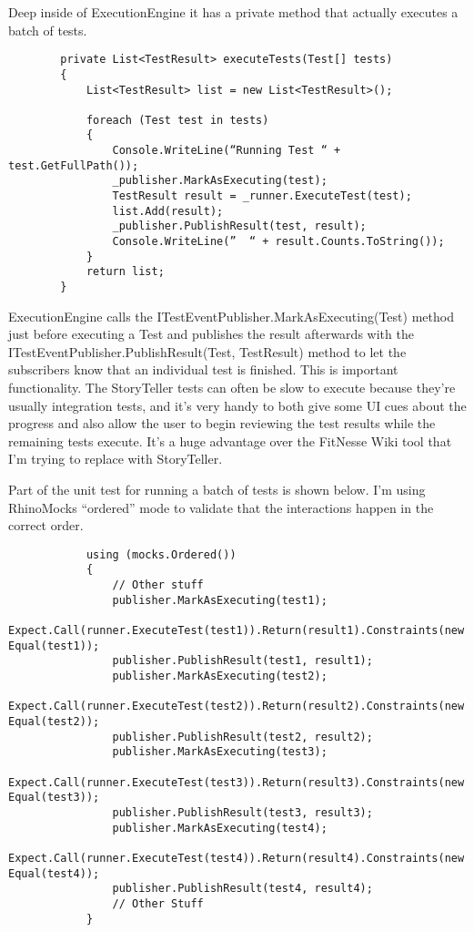 \documentclass{article}
\begin{document}
{Deep inside of ExecutionEngine it has a private method that actually executes a batch of tests. 
\begin{lstlisting}
        private List<TestResult> executeTests(Test[] tests)
        {
            List<TestResult> list = new List<TestResult>();

            foreach (Test test in tests)
            {
                Console.WriteLine(“Running Test “ + test.GetFullPath());
                _publisher.MarkAsExecuting(test);
                TestResult result = _runner.ExecuteTest(test);
                list.Add(result);
                _publisher.PublishResult(test, result);
                Console.WriteLine(”  “ + result.Counts.ToString());
            }
            return list;
        }
\end{lstlisting}

ExecutionEngine calls the ITestEventPublisher.MarkAsExecuting(Test) method just before executing a Test and publishes the result afterwards with the ITestEventPublisher.PublishResult(Test, TestResult) method to let the subscribers know that an individual test is finished.  This is important functionality.  The StoryTeller tests can often be slow to execute because they're usually integration tests, and it's very handy to both give some UI cues about the progress and also allow the user to begin reviewing the test results while the remaining tests execute.  It's a huge advantage over the FitNesse Wiki tool that I'm trying to replace with StoryTeller. 

Part of the unit test for running a batch of tests is shown below.  I'm using RhinoMocks “ordered” mode to validate that the interactions happen in the correct order.

\begin{lstlisting}
            using (mocks.Ordered())
            {
                // Other stuff
                publisher.MarkAsExecuting(test1);
                Expect.Call(runner.ExecuteTest(test1)).Return(result1).Constraints(new Equal(test1));
                publisher.PublishResult(test1, result1);
                publisher.MarkAsExecuting(test2);
                Expect.Call(runner.ExecuteTest(test2)).Return(result2).Constraints(new Equal(test2));
                publisher.PublishResult(test2, result2);
                publisher.MarkAsExecuting(test3);
                Expect.Call(runner.ExecuteTest(test3)).Return(result3).Constraints(new Equal(test3));
                publisher.PublishResult(test3, result3);
                publisher.MarkAsExecuting(test4);
                Expect.Call(runner.ExecuteTest(test4)).Return(result4).Constraints(new Equal(test4));
                publisher.PublishResult(test4, result4);
                // Other Stuff
            }
\end{lstlisting}
 

}
\end{document}

